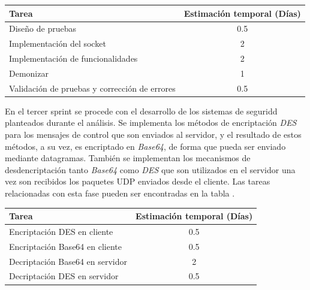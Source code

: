 \documentclass[12pt]{article}
\begin{document}
            \begin{tabular}{|l|c|}
                \hline
                \textbf{Tarea}                                                              &   \textbf{Estimación temporal} (Días) \\           
                \hline
                Diseño de pruebas                                                           &   0.5                                 \\
                Implementación del socket                                                   &   2                                   \\
                Implementación de funcionalidades                                           &   2                                   \\
                Demonizar                                                                   &   1                                   \\
                Validación de pruebas y corrección de errores                               &   0.5                                 \\
                \hline
            \end{tabular}

            En el tercer sprint se procede con el desarrollo de los sistemas de seguridd planteados durante el análisis. Se implementa los métodos de encriptación \textit{DES} para los mensajes de control que son enviados al servidor, y el resultado de estos métodos, a su vez, es encriptado en \textit{Base64}, de forma que pueda ser enviado mediante datagramas. También se implementan los mecanismos de desdencriptación tanto \textit{Base64} como \textit{DES} que son utilizados en el servidor una vez son recibidos los paquetes UDP enviados desde el cliente. Las tareas relacionadas con esta fase pueden ser encontradas en la tabla .

            \begin{tabular}{|l|c|}
                \hline
                \textbf{Tarea}                                                              &   \textbf{Estimación temporal} (Días) \\           
                \hline
                Encriptación DES en cliente                                                 &   0.5                                 \\
                Encriptación Base64 en cliente                                              &   0.5                                 \\
                Decriptación Base64 en servidor                                             &   2                                   \\
                Decriptación DES en servidor                                                &   0.5                                 \\
                \hline
            \end{tabular}
\end{document}
